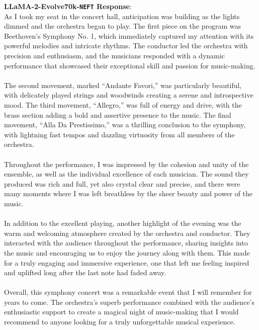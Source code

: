 \documentclass{article} %
\newcommand{\neft}{\texttt{NEFT}}
\newcommand{\llama}{LLaMA}
\begin{document}
\begin{tcolorbox}[breakable,boxrule=0pt]
  \textbf{\llama{}-2-Evolve70k-\neft{} Response}: \\As I took my seat in the concert hall, anticipation was building as the lights dimmed and the orchestra began to play. The first piece on the program was Beethoven's Symphony No. 1, which immediately captured my attention with its powerful melodies and intricate rhythms. The conductor led the orchestra with precision and enthusiasm, and the musicians responded with a dynamic performance that showcased their exceptional skill and passion for music-making.\\\\The second movement, marked ``Andante Favori,'' was particularly beautiful, with delicately played strings and woodwinds creating a serene and introspective mood. The third movement, ``Allegro,'' was full of energy and drive, with the brass section adding a bold and assertive presence to the music. The final movement, ``Alla Da Prestissimo,'' was a thrilling conclusion to the symphony, with lightning fast tempos and dazzling virtuosity from all members of the orchestra.\\\\Throughout the performance, I was impressed by the cohesion and unity of the ensemble, as well as the individual excellence of each musician. The sound they produced was rich and full, yet also crystal clear and precise, and there were many moments where I was left breathless by the sheer beauty and power of the music.\\\\In addition to the excellent playing, another highlight of the evening was the warm and welcoming atmosphere created by the orchestra and conductor. They interacted with the audience throughout the performance, sharing insights into the music and encouraging us to enjoy the journey along with them. This made for a truly engaging and immersive experience, one that left me feeling inspired and uplifted long after the last note had faded away.\\\\Overall, this symphony concert was a remarkable event that I will remember for years to come. The orchestra's superb performance combined with the audience's enthusiastic support to create a magical night of music-making that I would recommend to anyone looking for a truly unforgettable musical experience. \\

\end{tcolorbox}
\end{document}

